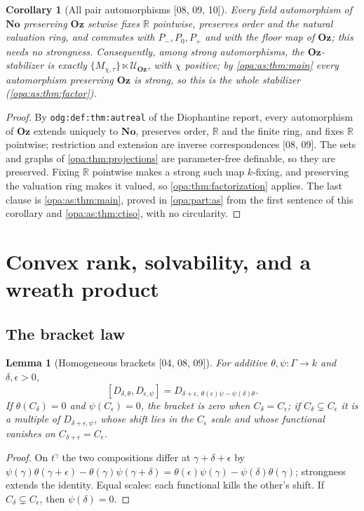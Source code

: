 \documentclass[11pt,oneside]{article}
\numberwithin{equation}{section}
\newtheorem{lemma}[lemma]{Lemma}
\newtheorem{corollary}[corollary]{Corollary}
\theoremstyle{definition}
\theoremstyle{remark}
\newcommand{\No}{\mathbf{No}}
\newcommand{\Oz}{\mathbf{Oz}}
\newcommand{\R}{\mathbb R}
\newcommand{\UU}{\mathcal U}
\newcommand{\src}[1]{\textup{\textsf{\small[#1]}}}
\newcommand{\lbl}[1]{\nolinkurl{#1}}
\begin{document}
\begin{corollary}[All pair automorphisms \src{08, 09, 10}]\label{opa:cor:allautos}
Every field automorphism of $\No$ preserving $\Oz$ setwise fixes $\R$ pointwise,
preserves order and the natural valuation ring, and commutes with $P_-,P_0,P_+$
and with the floor map of $\Oz$; this needs no strongness. Consequently, among
strong automorphisms, the $\Oz$-stabilizer is exactly
$\{M_{\chi,\tau}\}\ltimes\UU_\Oz$, with $\chi$ positive; by
\cref{opa:as:thm:main} every automorphism preserving $\Oz$ is strong, so this is
the whole stabilizer (\cref{opa:as:thm:factor}).
\end{corollary}
\begin{proof}
By \lbl{odg:def:thm:autreal} of the Diophantine report, every automorphism of
$\Oz$ extends uniquely to $\No$, preserves order, $\R$ and the finite ring, and
fixes $\R$ pointwise; restriction and extension are inverse correspondences
\src{08, 09}. The sets and graphs of \cref{opa:thm:projections} are
parameter-free definable, so they are preserved. Fixing $\R$ pointwise makes a
strong such map $k$-fixing, and preserving the valuation ring makes it valued,
so \cref{opa:thm:factorization} applies. The last clause is
\cref{opa:as:thm:main}, proved in \cref{opa:part:as} from the first sentence of
this corollary and \cref{opa:as:thm:ctiso}, with no circularity.
\end{proof}

\section{Convex rank, solvability, and a wreath product}\label{opa:sec:group}

\subsection{The bracket law}

\begin{lemma}[Homogeneous brackets \src{04, 08, 09}]\label{opa:lem:bracket}
For additive $\theta,\psi:\Gamma\to k$ and $\delta,\epsilon>0$,
\begin{equation}\label{opa:eq:bracket}
 [D_{\delta,\theta},D_{\epsilon,\psi}]=D_{\delta+\epsilon,\ \theta(\epsilon)\psi-\psi(\delta)\theta}.
\end{equation}
If $\theta(C_\delta)=0$ and $\psi(C_\epsilon)=0$, the bracket is zero when
$C_\delta=C_\epsilon$; if $C_\delta\subsetneq C_\epsilon$ it is a multiple of
$D_{\delta+\epsilon,\psi}$, whose shift lies in the $C_\epsilon$ scale and whose
functional vanishes on $C_{\delta+\epsilon}=C_\epsilon$.
\end{lemma}
\begin{proof}
On $t^\gamma$ the two compositions differ at $\gamma+\delta+\epsilon$ by
$\psi(\gamma)\theta(\gamma+\epsilon)-\theta(\gamma)\psi(\gamma+\delta)=
\theta(\epsilon)\psi(\gamma)-\psi(\delta)\theta(\gamma)$; strongness extends the
identity. Equal scales: each functional kills the other's shift. If
$C_\delta\subsetneq C_\epsilon$, then $\psi(\delta)=0$.
\end{proof}
\end{document}
